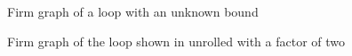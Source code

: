\begin{figure}[h]
    \centering
    \begin{adjustbox}{max width=\textwidth}
        \centering
        
    \end{adjustbox}
    \caption{Firm graph of a loop with an unknown bound}
    \label{fig:impl:unroll:unroll-factor-2-before}
\end{figure}
\begin{figure}[h]
    \centering
    \begin{adjustbox}{max width=\textwidth}
        \centering
        
    \end{adjustbox}
    \caption{Firm graph of the loop shown in  unrolled with a factor of two}
    \label{fig:impl:unroll:unroll-factor-2-after}
\end{figure}